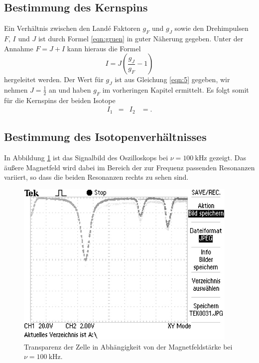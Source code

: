\subsection{Bestimmung des Kernspins}

Ein Verhältnis zwischen den Land\'{e} Faktoren $g_F$ und $g_J$ sowie den Drehimpulsen $F$, $I$ und $J$ ist durch Formel \eqref{eqn:gruen} in guter Näherung gegeben.
Unter der Annahme $F = J+I$ kann hieraus die Formel
\begin{equation}
  I = J ( \frac{g_J}{g_F} - 1)
\end{equation}
hergeleitet werden.
Der Wert für $g_J$ ist aus Gleichung \eqref{eqn:5} gegeben, wir nehmen $J = \frac{1}{2}$ an und haben $g_F$ im vorheringen Kapitel ermittelt.
Es folgt somit für die Kernspins der beiden Isotope
\begin{align*}
  I_1 &=  & I_2 &= .
\end{align*}

\subsection{Bestimmung des Isotopenverhältnisses}

In Abbildung \ref{fig:typisch} ist das Signalbild des Oszilloskops bei $\nu = \SI{100}{\kilo\hertz}$ gezeigt.
Das äußere Magnetfeld wird dabei im Bereich der zur Frequenz passenden Resonanzen variiert, so dass die beiden Resonanzen rechts zu sehen sind.

\begin{figure}
  \centering
  \includegraphics[height=8cm]{ressources/TEK0031.png}
  \caption{Transparenz der Zelle in Abhängigkeit von der Magnetfeldstärke bei $\nu = \SI{100}{\kilo\hertz}$.}
  \label{fig:typisch}
\end{figure}

